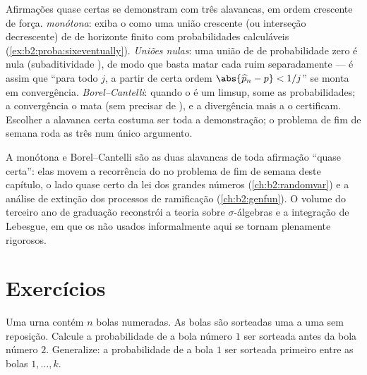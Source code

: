 \begin{remark}
Afirmações quase certas se demonstram com três alavancas, em
ordem crescente de força. \emph{ monótona}:
exiba o  como uma união crescente (ou interseção
decrescente) de  de horizonte finito com
probabilidades calculáveis (\cref{ex:b2:proba:sixeventually}).
\emph{Uniões nulas}: uma união  de  de
probabilidade zero é nula (subaditividade ), de modo que basta
matar cada  ruim separadamente --- é assim que ``para todo
$j$, a partir de certa ordem $\abs{\widehat p_n - p} < 1/j$'' se monta
em convergência. \emph{Borel--Cantelli}: quando o  é um
limsup, some as probabilidades; a convergência o mata
(sem precisar de ), e a divergência mais a 
o certificam. Escolher a alavanca certa costuma ser toda a
demonstração; o problema de fim de semana roda as três num único
argumento.
\end{remark}

\begin{remark}
A  monótona e Borel--Cantelli são as duas alavancas de
toda afirmação ``quase certa'': elas movem a recorrência do
 no problema de fim de semana deste capítulo, o
lado quase certo da lei dos grandes números
(\cref{ch:b2:randomvar}) e a análise de extinção dos
processos de ramificação (\cref{ch:b2:genfun}). O volume do terceiro ano de graduação
reconstrói a teoria sobre $\sigma$-álgebras e a integração
de Lebesgue, em que os  não  usados
informalmente aqui se tornam plenamente rigorosos.
\end{remark}

\section{Exercícios}

\begin{exercise}[$\star$]\label{exo:b2:proba:1}
Uma urna contém $n$ bolas numeradas. As bolas são sorteadas uma a uma
sem reposição. Calcule a probabilidade de a bola número $1$
ser sorteada antes da bola número $2$. Generalize: a probabilidade de a
bola $1$ ser sorteada primeiro entre as bolas $1, \dots, k$.
\end{exercise}

